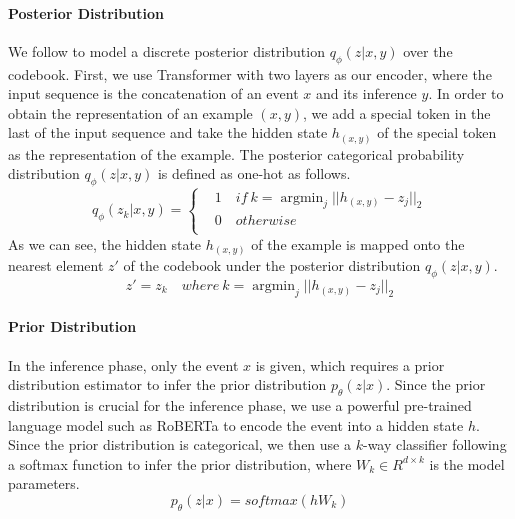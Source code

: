 \documentclass[11pt,a4paper]{article}
\begin{document}
\paragraph{Posterior Distribution} We follow \citet{van2017neural} to model a discrete posterior distribution $q_\phi(z|x,y)$ over the codebook.
First, we use Transformer \cite{vaswani2017attention} with two layers as our encoder, where the input sequence is the concatenation of an event $x$ and its inference $y$. In order to obtain the representation of an example $(x,y)$, we add a special token in the last of the input sequence and take the hidden state $h_{(x,y)}$ of the special token as the representation of the example. 
The posterior categorical probability distribution $q_\phi(z|x,y)$ is defined as one-hot as follows.
\begin{equation}\label{p_phi(z_k|x,y)}
q_\phi(z_k|x,y)=\left\{
\begin{aligned}
& 1\quad\!\!\! if\ k=\mathop{\arg\min}_{j}||h_{(x,y)}-z_j||_2 \\
& 0\quad\!\!\! otherwise \\
\end{aligned}
\right.
\end{equation}
As we can see, the hidden state $h_{(x,y)}$ of the example is mapped onto the nearest element $z'$ of the codebook under the posterior distribution $q_\phi(z|x,y)$.
\begin{equation}\label{z'}
z'=z_k\quad where\  k=\mathop{\arg\min}_{j}||h_{(x,y)}-z_j||_2 
\end{equation}

\paragraph{Prior Distribution}
In the inference phase, only the event $x$ is given, which requires a prior distribution estimator to infer the prior distribution $p_\theta(z|x)$. Since the prior distribution is crucial for the inference phase, we use a powerful pre-trained language model such as RoBERTa \cite{liu2019roberta} to encode the event into a hidden state $h$. 
Since the prior distribution is categorical, we then use a $k$-way classifier following a softmax function to infer the prior distribution, where $W_k\in{R^{d\times k}}$ is the model parameters.
\begin{equation}
p_\theta(z|x)=softmax(hW_k)
\end{equation}
\end{document}
